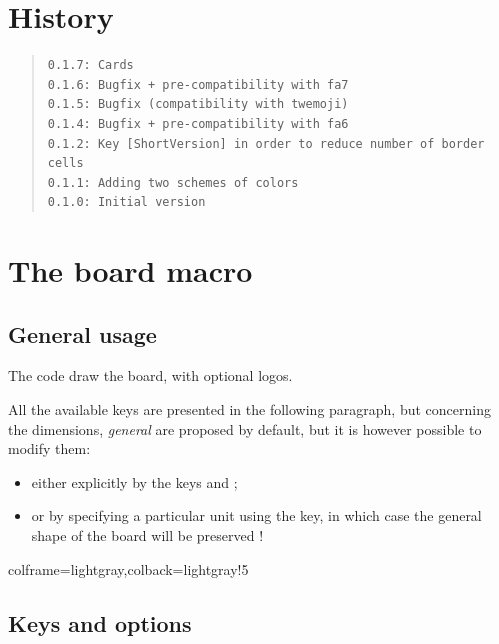 \documentclass[11pt,a4paper]{ltxdoc}
\begin{document}
\pagebreak

\section{History}

\begin{quote}
\begin{verbatim}
0.1.7: Cards
0.1.6: Bugfix + pre-compatibility with fa7
0.1.5: Bugfix (compatibility with twemoji)
0.1.4: Bugfix + pre-compatibility with fa6
0.1.2: Key [ShortVersion] in order to reduce number of border cells
0.1.1: Adding two schemes of colors
0.1.0: Initial version
\end{verbatim}
\end{quote}

\pagebreak

\section{The board macro}

\subsection{General usage}

The code draw the board, with optional logos.

All the available keys are presented in the following paragraph, but concerning the dimensions, \textit{general} are proposed by default, but it is however possible to modify them:

\begin{itemize}
	\item either explicitly by the keys \MontreCode{[Radius=]} and \MontreCode{[BorderHeight=]};
	\item or by specifying a particular unit using the \MontreCode{[Unit=]} key, in which case the general shape of the board will be preserved !
\end{itemize}

\begin{tcblisting}{colframe=lightgray,colback=lightgray!5}
\BoardTrivialPursuit[Unit=0.5]
%
\BoardTrivialPursuit[Radius=4,BorderHeight=1.25] %

\BoardTrivialPursuit[Unit=0.33]
%
\BoardTrivialPursuit[Unit=0.33,ShortVersion]
\end{tcblisting}

\pagebreak

\subsection{Keys and options}
\end{document}
